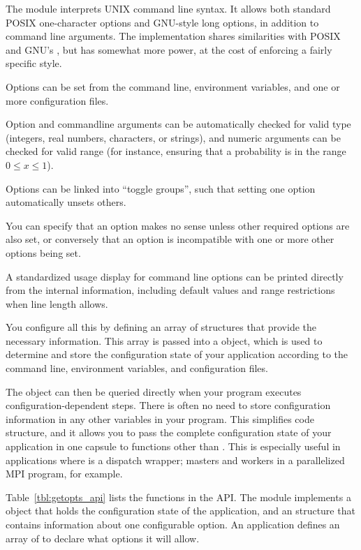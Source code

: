 
The  module interprets UNIX command line syntax. It
allows both standard POSIX one-character options and GNU-style long
options, in addition to command line arguments. The implementation
shares similarities with POSIX  and GNU's
, but has somewhat more power, at the cost of
enforcing a fairly specific style.

Options can be set from the command line, environment variables, and
one or more configuration files.

Option and commandline arguments can be automatically checked for
valid type (integers, real numbers, characters, or strings), and
numeric arguments can be checked for valid range (for instance,
ensuring that a probability is in the range $0 \leq x \leq 1$).

Options can be linked into ``toggle groups'', such that setting one
option automatically unsets others. 

You can specify that an option makes no sense unless other required
options are also set, or conversely that an option is incompatible
with one or more other options being set. 

A standardized usage display for command line options can be printed
directly from the internal information, including default values and
range restrictions when line length allows. 

You configure all this by defining an array of 
structures that provide the necessary information. This array is
passed into a  object, which is used to determine
and store the configuration state of your application according to the
command line, environment variables, and configuration files.

The  object can then be queried directly when your
program executes configuration-dependent steps. There is often no need
to store configuration information in any other variables in your
program. This simplifies code structure, and it allows you to pass the
complete configuration state of your application in one capsule to
functions other than . This is especially useful in
applications where  is a dispatch wrapper; masters and
workers in a parallelized MPI program, for example.

Table~\ref{tbl:getopts_api} lists the functions in the
 API. The module implements a 
object that holds the configuration state of the application, and an
 structure that contains information about one
configurable option. An application defines an array of
 to declare what options it will allow.

